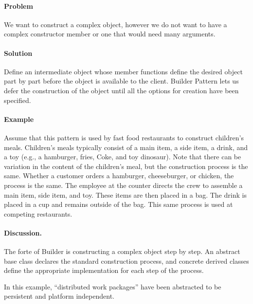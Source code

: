 \documentclass{book}
\begin{document}
\paragraph{Problem}
We want to construct a complex object, however we do not want to have a complex constructor member or one that would need many arguments.
\paragraph{Solution}
Define an intermediate object whose member functions define the desired object part by part before the object is available to the client.
Builder Pattern lets us defer the construction of the object until all the options for creation have been specified. 
\paragraph{Example}
Assume that this pattern is used by fast food restaurants to construct children's meals.
Children's meals typically consist of a main item, a side item, a drink, and a toy (e.g., a hamburger, fries, Coke, and toy dinosaur).
Note that there can be variation in the content of the children's meal, but the construction process is the same.
Whether a customer orders a hamburger, cheeseburger, or chicken, the process is the same.
The employee at the counter directs the crew to assemble a main item, side item, and toy.
These items are then placed in a bag. The drink is placed in a cup and remains outside of the bag. This same process is used at competing restaurants.

\begin{figure}[H]
\begin{floatrow}
\end{floatrow}
\end{figure}

\paragraph{Discussion.}
The forte of Builder is constructing a complex object step by step.
An abstract base class declares the standard construction process, and concrete derived classes define the appropriate implementation for each step of the process.

In this example, ``distributed work packages'' have been abstracted to be persistent and platform independent.
\end{document}
